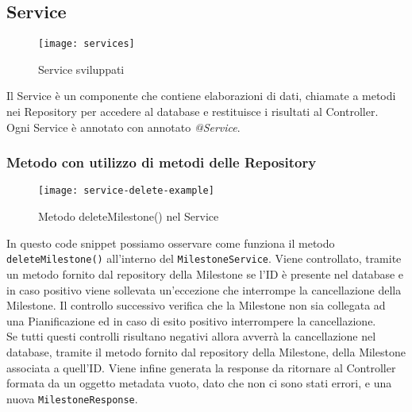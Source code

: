 \subsection{Service}
\begin{figure}[H] 
    \centering 
    \texttt{[image: services]} 
    \caption{Service sviluppati}
\end{figure}
Il Service è un componente che contiene elaborazioni di dati, chiamate a metodi nei Repository per accedere al database e restituisce i risultati al Controller.\\
Ogni Service è annotato con annotato \textit{@Service}.

\subsubsection{Metodo con utilizzo di metodi delle Repository}
\begin{figure}[H] 
    \centering 
    \texttt{[image: service-delete-example]} 
    \caption{Metodo deleteMilestone() nel Service}
\end{figure}
\noindent In questo code snippet possiamo osservare come funziona il metodo \texttt{deleteMilestone()} all'interno del \texttt{MilestoneService}. Viene controllato, tramite un metodo fornito dal repository della Milestone se l'ID è presente nel database e in caso positivo viene sollevata un'eccezione che interrompe la cancellazione della Milestone. Il controllo successivo verifica che la Milestone non sia collegata ad una Pianificazione ed in caso di esito positivo interrompere la cancellazione.\\
Se tutti questi controlli risultano negativi allora avverrà la cancellazione nel database, tramite il metodo fornito dal repository della Milestone, della Milestone associata a quell'ID. Viene infine generata la response da ritornare al Controller formata da un oggetto metadata vuoto, dato che non ci sono stati errori, e una nuova \texttt{MilestoneResponse}.

